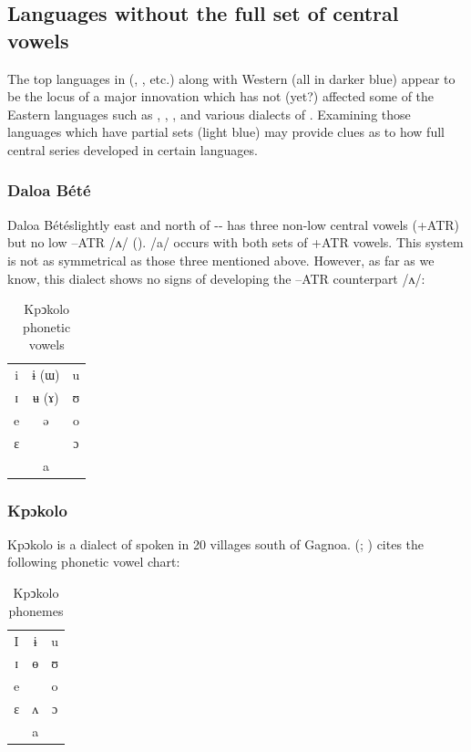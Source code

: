 \documentclass[output=paper,newtxmath,modfonts,nonflat]{langsci/langscibook}
\begin{document}
\subsection{Languages without the full set of central vowels}\label{sec:zogbo:2.2} 

The top languages in  (,  , etc.) along with Western  (all in darker blue) appear to be the locus of a major innovation which has not (yet?) affected some of the Eastern languages such as , , , and various dialects of . Examining those languages which have partial sets (light blue) may provide clues as to how full central series developed in certain languages. 

\subsubsection{ {Daloa} Bété}
{Daloa} Bétéslightly east and north of -- has three non-low central vowels (+ATR) but no low –ATR /ʌ/ (\citealt{Zogbo2005}). /a/ occurs with both sets of +ATR vowels. This system is not as symmetrical as those three mentioned above. However, as far as we know, this dialect shows no signs of developing the –ATR counterpart /ʌ/: 

\begin{table} 
\begin{tabular}{ccc}
i  &  ɨ (ɯ) &   u\\

ɪ  &  ʉ (ɤ)  &  ʊ\\

e  &  ə  &  o\\

ɛ  &   &   ɔ\\

&a&\\
\end{tabular}
\caption{Kpↄkolo phonetic vowels}
\label{tab:zogbo:11}
\end{table}

\subsubsection{Kpɔkolo} 
Kpɔkolo
is a dialect of  spoken in 20 villages south of Gagnoa. \citeauthor{Goprou2014} (\citeyear{Goprou2010}; \citeyear[175, 179]{Goprou2014}) cites the following phonetic vowel chart: 

\begin{table} 
\caption{Kpↄkolo phonemes}
\label{tab:zogbo:12}
\begin{tabular}{ccc}
I  &  ɨ  &  u\\

ɪ  &  ɵ  &  ʊ\\

e   & &    o\\

ɛ   & ʌ  &  ɔ\\

	& a\\
\end{tabular}	
\end{table}
\end{document}
